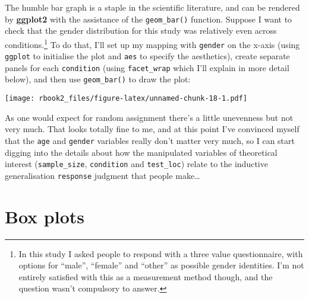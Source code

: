 \documentclass[]{book}
\newenvironment{Shaded}{\begin{snugshade}}{\end{snugshade}}
\newcommand{\CommentTok}[1]{\textcolor[rgb]{0.56,0.35,0.01}{\textit{#1}}}
\newcommand{\DataTypeTok}[1]{\textcolor[rgb]{0.13,0.29,0.53}{#1}}
\newcommand{\KeywordTok}[1]{\textcolor[rgb]{0.13,0.29,0.53}{\textbf{#1}}}
\newcommand{\NormalTok}[1]{#1}
\newcommand{\OperatorTok}[1]{\textcolor[rgb]{0.81,0.36,0.00}{\textbf{#1}}}
\newcommand{\StringTok}[1]{\textcolor[rgb]{0.31,0.60,0.02}{#1}}
\let\rmarkdownfootnote\footnote%
\def\footnote{\protect\rmarkdownfootnote}
\begin{document}
The humble bar graph is a staple in the scientific literature, and can be rendered by \textbf{ggplot2} with the assistance of the \texttt{geom\_bar()} function. Suppose I want to check that the gender distribution for this study was relatively even across conditions.\footnote{In this study I asked people to respond with a three value questionnaire, with options for ``male'', ``female'' and ``other'' as possible gender identities. I'm not entirely satisfied with this as a measurement method though, and the question wasn't compulsory to answer.} To do that, I'll set up my mapping with \texttt{gender} on the x-axis (using \texttt{ggplot} to initialise the plot and \texttt{aes} to specify the aesthetics), create separate panels for each \texttt{condition} (using \texttt{facet\_wrap} which I'll explain in more detail below), and then use \texttt{geom\_bar()} to draw the plot:

\begin{Shaded}
\end{Shaded}

\texttt{[image: rbook2\_files/figure-latex/unnamed-chunk-18-1.pdf]}

As one would expect for random assignment there's a little unevenness but not very much. That looks totally fine to me, and at this point I've convinced myself that the \texttt{age} and \texttt{gender} variables really don't matter very much, so I can start digging into the details about how the manipulated variables of theoretical interest (\texttt{sample\_size}, \texttt{condition} and \texttt{test\_loc}) relate to the inductive generalisation \texttt{response} judgment that people make\ldots{}

\hypertarget{box-plots}{%
\section{Box plots}\label{box-plots}}
\end{document}

